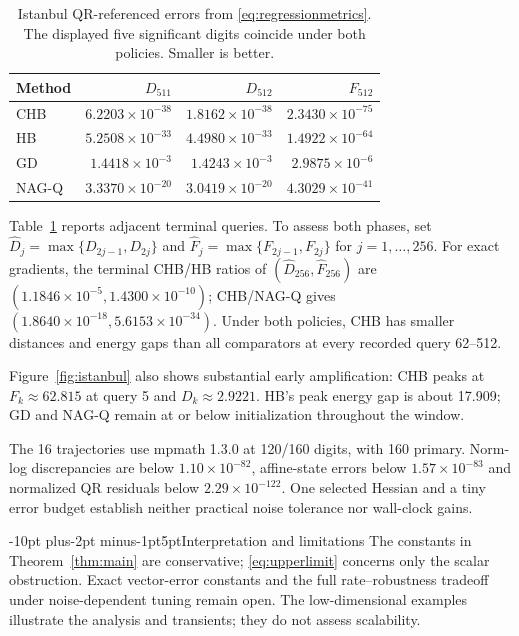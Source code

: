 \documentclass[pdflatex,sn-mathphys-num]{sn-jnl}
\makeatletter
\renewcommand\section{\@startsection{section}{1}{\z@}%
  {-10pt plus-2pt minus-1pt}{5pt}{\sectionfont}}
\theoremstyle{thmstyleone}
\theoremstyle{thmstyletwo}
\makeatother
\begin{document}
\begin{table}[htbp]
\centering
\caption{Istanbul QR-referenced errors from \eqref{eq:regressionmetrics}. The displayed
five significant digits coincide under both policies. Smaller is better.}
\label{tab:istanbulfour}
\small
\begin{tabular}{@{}lrrr@{}}
\toprule
Method & $D_{511}$ & $D_{512}$ & $F_{512}$\\
\midrule
CHB & $6.2203\times10^{-38}$ & $1.8162\times10^{-38}$ & $2.3430\times10^{-75}$\\
HB & $5.2508\times10^{-33}$ & $4.4980\times10^{-33}$ & $1.4922\times10^{-64}$\\
GD & $1.4418\times10^{-3}$ & $1.4243\times10^{-3}$ & $2.9875\times10^{-6}$\\
NAG-Q & $3.3370\times10^{-20}$ & $3.0419\times10^{-20}$ & $4.3029\times10^{-41}$\\
\bottomrule
\end{tabular}
\end{table}

Table~\ref{tab:istanbulfour} reports adjacent terminal queries. To assess both phases, set
$\widehat D_j=\max\{D_{2j-1},D_{2j}\}$ and
$\widehat F_j=\max\{F_{2j-1},F_{2j}\}$ for $j=1,\ldots,256$.
For exact gradients, the terminal CHB/HB ratios of
$(\widehat D_{256},\widehat F_{256})$ are
$(1.1846\times10^{-5},1.4300\times10^{-10})$; CHB/NAG-Q gives
$(1.8640\times10^{-18},5.6153\times10^{-34})$.
Under both policies, CHB has smaller distances and energy gaps than all
comparators at every recorded query 62--512.

Figure~\ref{fig:istanbul} also shows substantial early amplification:
CHB peaks at $F_k\approx62.815$ at query 5 and $D_k\approx2.9221$.
HB's peak energy gap is about 17.909; GD and NAG-Q remain at or below
initialization throughout the window.

The 16 trajectories use mpmath 1.3.0 at 120/160 digits, with 160 primary.
Norm-log discrepancies are below $1.10\times10^{-82}$, affine-state errors
below $1.57\times10^{-83}$ and normalized QR residuals below
$2.29\times10^{-122}$. One selected Hessian and a tiny error budget
establish neither practical noise tolerance nor wall-clock gains.

\section{Interpretation and limitations}\label{sec:discussion}
The constants in Theorem~\ref{thm:main} are conservative;
\eqref{eq:upperlimit} concerns only the scalar obstruction. Exact
vector-error constants and the full rate--robustness tradeoff under
noise-dependent tuning remain open. The low-dimensional examples
illustrate the analysis and transients; they do not assess scalability.
\end{document}

